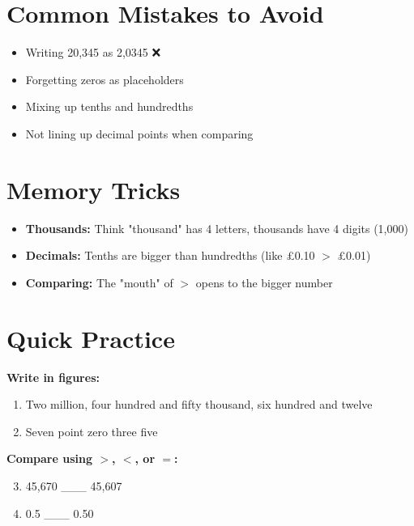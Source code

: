 \documentclass[a4paper,11pt]{article}
\begin{document}
\section{Common Mistakes to Avoid}

\begin{tcolorbox}[colback=purple!5!white,colframe=purple!75!black,title=\textbf{Watch Out!}]
\begin{itemize}
    \item Writing 20,345 as 2,0345 ❌
    \item Forgetting zeros as placeholders
    \item Mixing up tenths and hundredths
    \item Not lining up decimal points when comparing
\end{itemize}
\end{tcolorbox}

\section{Memory Tricks}

\begin{itemize}
    \item \textbf{Thousands:} Think "thousand" has 4 letters, thousands have 4 digits (1,000)
    \item \textbf{Decimals:} Tenths are bigger than hundredths (like £0.10 $>$ £0.01)
    \item \textbf{Comparing:} The "mouth" of $>$ opens to the bigger number
\end{itemize}

\section{Quick Practice}

\textbf{Write in figures:}
\begin{enumerate}
    \item Two million, four hundred and fifty thousand, six hundred and twelve
    \item Seven point zero three five
\end{enumerate}

\textbf{Compare using $>$, $<$, or $=$:}
\begin{enumerate}
    \setcounter{enumi}{2}
    \item 45,670 \_\_\_ 45,607
    \item 0.5 \_\_\_ 0.50
\end{enumerate}
\end{document}
